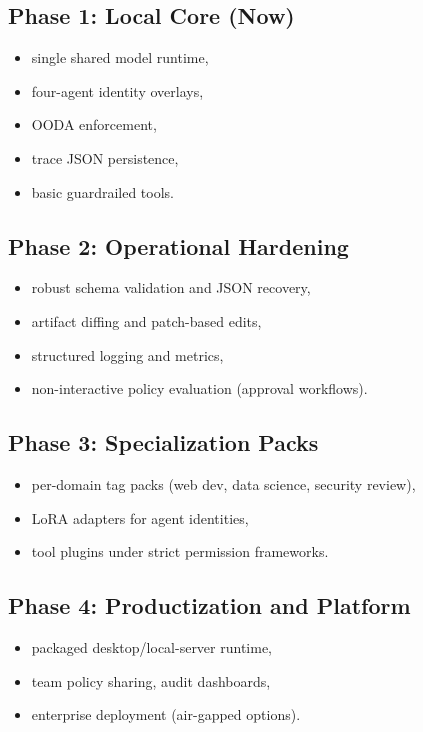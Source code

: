 \documentclass[11pt]{article}
\begin{document}
\subsection{Phase 1: Local Core (Now)}
\begin{itemize}
  \item single shared model runtime,
  \item four-agent identity overlays,
  \item OODA enforcement,
  \item trace JSON persistence,
  \item basic guardrailed tools.
\end{itemize}

\subsection{Phase 2: Operational Hardening}
\begin{itemize}
  \item robust schema validation and JSON recovery,
  \item artifact diffing and patch-based edits,
  \item structured logging and metrics,
  \item non-interactive policy evaluation (approval workflows).
\end{itemize}

\subsection{Phase 3: Specialization Packs}
\begin{itemize}
  \item per-domain tag packs (web dev, data science, security review),
  \item LoRA adapters for agent identities,
  \item tool plugins under strict permission frameworks.
\end{itemize}

\subsection{Phase 4: Productization and Platform}
\begin{itemize}
  \item packaged desktop/local-server runtime,
  \item team policy sharing, audit dashboards,
  \item enterprise deployment (air-gapped options).
\end{itemize}
\end{document}
